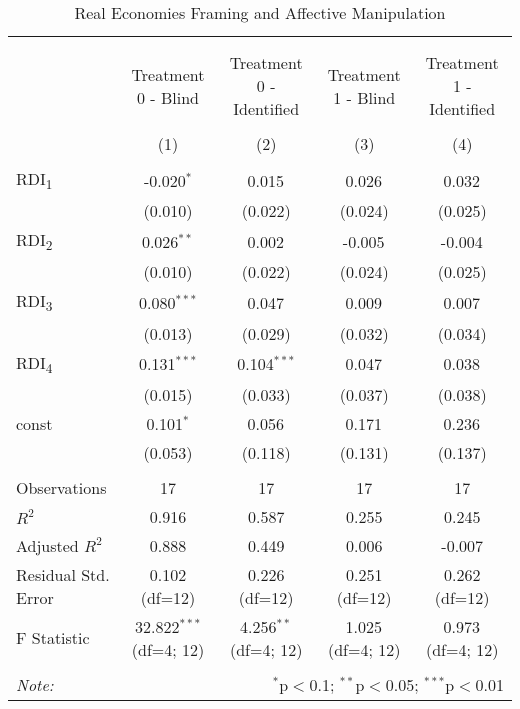 \begin{table}[!htbp]
\centering
\caption{Real Economies Framing and Affective Manipulation}

\begin{tabular}{@{\extracolsep{2pt}}lcccc}
\\[-1.8ex]\hline
\hline \\[-1.8ex]
\\[-1.8ex] & \multicolumn{1}{c}{Treatment 0 - Blind} & \multicolumn{1}{c}{Treatment 0 - Identified} & \multicolumn{1}{c}{Treatment 1 - Blind} & \multicolumn{1}{c}{Treatment 1 - Identified}  \\
\\[-1.8ex] & (1) & (2) & (3) & (4) \\
\hline \\[-1.8ex]
 RDI\textsubscript{1} & -0.020$^{*}$ & 0.015$^{}$ & 0.026$^{}$ & 0.032$^{}$ \\
& (0.010) & (0.022) & (0.024) & (0.025) \\
 RDI\textsubscript{2} & 0.026$^{**}$ & 0.002$^{}$ & -0.005$^{}$ & -0.004$^{}$ \\
& (0.010) & (0.022) & (0.024) & (0.025) \\
 RDI\textsubscript{3} & 0.080$^{***}$ & 0.047$^{}$ & 0.009$^{}$ & 0.007$^{}$ \\
& (0.013) & (0.029) & (0.032) & (0.034) \\
 RDI\textsubscript{4} & 0.131$^{***}$ & 0.104$^{***}$ & 0.047$^{}$ & 0.038$^{}$ \\
& (0.015) & (0.033) & (0.037) & (0.038) \\
 const & 0.101$^{*}$ & 0.056$^{}$ & 0.171$^{}$ & 0.236$^{}$ \\
& (0.053) & (0.118) & (0.131) & (0.137) \\
\hline \\[-1.8ex]
 Observations & 17 & 17 & 17 & 17 \\
 $R^2$ & 0.916 & 0.587 & 0.255 & 0.245 \\
 Adjusted $R^2$ & 0.888 & 0.449 & 0.006 & -0.007 \\
 Residual Std. Error & 0.102 (df=12) & 0.226 (df=12) & 0.251 (df=12) & 0.262 (df=12) \\
 F Statistic & 32.822$^{***}$ (df=4; 12) & 4.256$^{**}$ (df=4; 12) & 1.025$^{}$ (df=4; 12) & 0.973$^{}$ (df=4; 12) \\
\hline
\hline \\[-1.8ex]
\textit{Note:} & \multicolumn{4}{r}{$^{*}$p$<$0.1; $^{**}$p$<$0.05; $^{***}$p$<$0.01} \\
\end{tabular}
\end{table}
